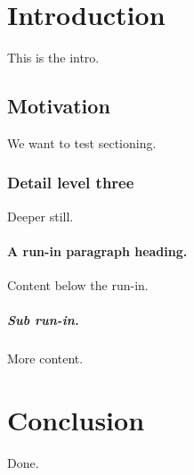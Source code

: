 \documentclass{article}
\begin{document}
\section{Introduction}
This is the intro.
\subsection{Motivation}
We want to test sectioning.
\subsubsection{Detail level three}
Deeper still.
\paragraph{A run-in paragraph heading.}
Content below the run-in.
\subparagraph{Sub run-in.}
More content.
\section{Conclusion}
Done.
\end{document}

